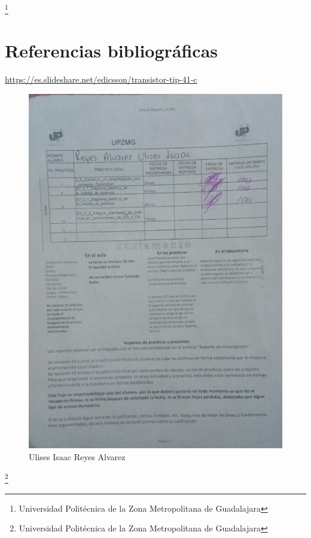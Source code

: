 \documentclass[10pt,a4paper]{article}
\begin{document}
\footnote{Universidad Politécnica de la Zona Metropolitana de Guadalajara}

\newpage
\section{Referencias bibliográficas}
\url{https://es.slideshare.net/edicsson/transistor-tip-41-c}

\begin{figure}[hbtp]
\centering
\includegraphics[scale=0.42]{Pictures/ULISES.png}
\caption{Ulises Isaac Reyes Alvarez  }
\end{figure}
\footnote{Universidad Politécnica de la Zona Metropolitana de Guadalajara}
\end{document}
